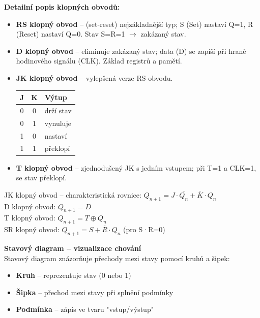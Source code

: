 \documentclass[a4paper,10pt]{article}
\begin{document}
\begin{vysvetlenibox}
\textbf{Detailní popis klopných obvodů:}
\begin{itemize}[noitemsep, leftmargin=1.4em, topsep=4pt]
    \item \textbf{RS klopný obvod} -- (set-reset) nejzákladnější typ; S (Set) nastaví Q=1,
          R (Reset) nastaví Q=0. Stav S=R=1 $\rightarrow$ zakázaný stav.
    \item \textbf{D klopný obvod} -- eliminuje zakázaný stav; data (D) se
          zapíší při hraně hodinového signálu (CLK). Základ registrů a pamětí.
    \item \textbf{JK klopný obvod} -- vylepšená verze RS obvodu.
    \begin{center}
    \begin{tabular}{|c|c|l|}
    	\hline
    	J & K & Výtup\\
    	\hline
    	0 & 0 & drží stav\\
    	0 & 1 & vynuluje\\
    	1 & 0 & nastaví\\
    	1 & 1 & překlopí\\
    	\hline
    \end{tabular}
	\end{center}
    \item \textbf{T klopný obvod} -- zjednodušený JK s jedním vstupem;
          při T=1 a CLK=1, se stav překlopí.
\end{itemize}

\begin{vzorcebox}
JK klopný obvod -- charakteristická rovnice:
$Q_{n+1} = J \cdot \overline{Q_n} + \overline{K} \cdot Q_n$\\
D klopný obvod: $Q_{n+1} = D$\\
T klopný obvod: $Q_{n+1} = T \oplus Q_n$\\
SR klopný obvod: $Q_{n+1} = S + \overline{R} \cdot Q_n$ (pro S·R=0)
\end{vzorcebox}

\textbf{Stavový diagram -- vizualizace chování}\\
Stavový diagram znázorňuje přechody mezi stavy pomocí kruhů a šipek:
\begin{itemize}[noitemsep, leftmargin=1.4em, topsep=4pt]
    \item \textbf{Kruh} -- reprezentuje stav (0 nebo 1)
    \item \textbf{Šipka} -- přechod mezi stavy při splnění podmínky
    \item \textbf{Podmínka} -- zápis ve tvaru "vstup/výstup"
\end{itemize}


\end{vysvetlenibox}
\end{document}
